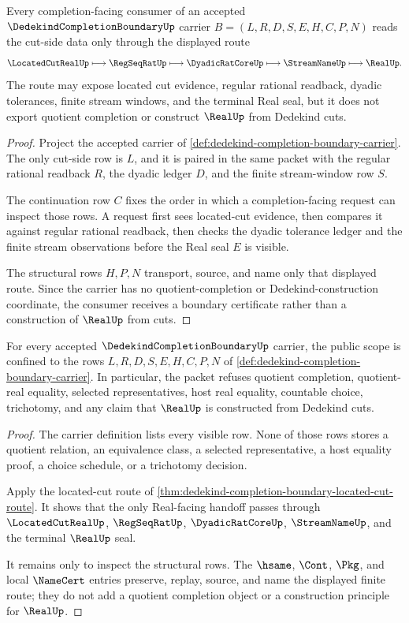 \begin{theorem}
\label{thm:dedekind-completion-boundary-located-cut-route}
Every completion-facing consumer of an accepted $\DedekindCompletionBoundaryUp$ carrier $B=(L,R,D,S,E,H,C,P,N)$ reads the cut-side data only through the displayed route
$$
\LocatedCutRealUp \longmapsto \RegSeqRatUp \longmapsto \DyadicRatCoreUp \longmapsto \StreamNameUp \longmapsto \RealUp .
$$
The route may expose located cut evidence, regular rational readback, dyadic tolerances, finite stream windows, and the terminal Real seal, but it does not export quotient completion or construct $\RealUp$ from Dedekind cuts.
\end{theorem}
\begin{proof}
Project the accepted carrier of \autoref{def:dedekind-completion-boundary-carrier}. The only cut-side row is $L$, and it is paired in the same packet with the regular rational readback $R$, the dyadic ledger $D$, and the finite stream-window row $S$.

The continuation row $C$ fixes the order in which a completion-facing request can inspect those rows. A request first sees located-cut evidence, then compares it against regular rational readback, then checks the dyadic tolerance ledger and the finite stream observations before the Real seal $E$ is visible.

The structural rows $H,P,N$ transport, source, and name only that displayed route. Since the carrier has no quotient-completion or Dedekind-construction coordinate, the consumer receives a boundary certificate rather than a construction of $\RealUp$ from cuts.
\end{proof}

\begin{theorem}
\label{thm:dedekind-completion-boundary-no-quotient-scope}
For every accepted $\DedekindCompletionBoundaryUp$ carrier, the public scope is confined to the rows $L,R,D,S,E,H,C,P,N$ of \autoref{def:dedekind-completion-boundary-carrier}. In particular, the packet refuses quotient completion, quotient-real equality, selected representatives, host real equality, countable choice, trichotomy, and any claim that $\RealUp$ is constructed from Dedekind cuts.
\end{theorem}
\begin{proof}
The carrier definition lists every visible row. None of those rows stores a quotient relation, an equivalence class, a selected representative, a host equality proof, a choice schedule, or a trichotomy decision.

Apply the located-cut route of \autoref{thm:dedekind-completion-boundary-located-cut-route}. It shows that the only Real-facing handoff passes through $\LocatedCutRealUp$, $\RegSeqRatUp$, $\DyadicRatCoreUp$, $\StreamNameUp$, and the terminal $\RealUp$ seal.

It remains only to inspect the structural rows. The $\hsame$, $\Cont$, $\Pkg$, and local $\NameCert$ entries preserve, replay, source, and name the displayed finite route; they do not add a quotient completion object or a construction principle for $\RealUp$.
\end{proof}

